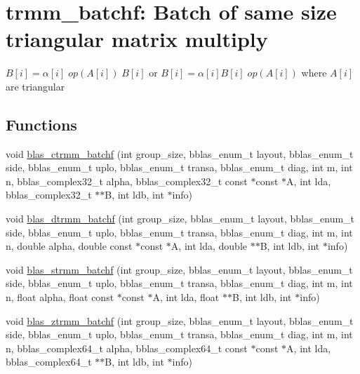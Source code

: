 \hypertarget{group__trmm__batchf}{}\section{trmm\+\_\+batchf\+: Batch of same size triangular matrix multiply}
\label{group__trmm__batchf}


$ B[i] = \alpha[i] \;op(A[i])\; B[i] $ or $ B[i] = \alpha[i] B[i] \;op(A[i]) $ where $ A[i] $ are triangular  


\subsection*{Functions}
\begin{DoxyCompactItemize}
\item 
void \hyperlink{group__trmm__batchf_ga64f7bbfcf4afda9c0cb5ed92dfe875ea}{blas\+\_\+ctrmm\+\_\+batchf} (int group\+\_\+size, bblas\+\_\+enum\+\_\+t layout, bblas\+\_\+enum\+\_\+t side, bblas\+\_\+enum\+\_\+t uplo, bblas\+\_\+enum\+\_\+t transa, bblas\+\_\+enum\+\_\+t diag, int m, int n, bblas\+\_\+complex32\+\_\+t alpha, bblas\+\_\+complex32\+\_\+t const $\ast$const $\ast$A, int lda, bblas\+\_\+complex32\+\_\+t $\ast$$\ast$B, int ldb, int $\ast$info)
\item 
void \hyperlink{group__trmm__batchf_ga5ec52f4bdb997bc0f3c8045fbd7a3280}{blas\+\_\+dtrmm\+\_\+batchf} (int group\+\_\+size, bblas\+\_\+enum\+\_\+t layout, bblas\+\_\+enum\+\_\+t side, bblas\+\_\+enum\+\_\+t uplo, bblas\+\_\+enum\+\_\+t transa, bblas\+\_\+enum\+\_\+t diag, int m, int n, double alpha, double const $\ast$const $\ast$A, int lda, double $\ast$$\ast$B, int ldb, int $\ast$info)
\item 
void \hyperlink{group__trmm__batchf_ga5c431462721e9faae6711830d473c713}{blas\+\_\+strmm\+\_\+batchf} (int group\+\_\+size, bblas\+\_\+enum\+\_\+t layout, bblas\+\_\+enum\+\_\+t side, bblas\+\_\+enum\+\_\+t uplo, bblas\+\_\+enum\+\_\+t transa, bblas\+\_\+enum\+\_\+t diag, int m, int n, float alpha, float const $\ast$const $\ast$A, int lda, float $\ast$$\ast$B, int ldb, int $\ast$info)
\item 
void \hyperlink{group__trmm__batchf_ga8649c49d5fcfc65a5cf0432fdf29660b}{blas\+\_\+ztrmm\+\_\+batchf} (int group\+\_\+size, bblas\+\_\+enum\+\_\+t layout, bblas\+\_\+enum\+\_\+t side, bblas\+\_\+enum\+\_\+t uplo, bblas\+\_\+enum\+\_\+t transa, bblas\+\_\+enum\+\_\+t diag, int m, int n, bblas\+\_\+complex64\+\_\+t alpha, bblas\+\_\+complex64\+\_\+t const $\ast$const $\ast$A, int lda, bblas\+\_\+complex64\+\_\+t $\ast$$\ast$B, int ldb, int $\ast$info)
\end{DoxyCompactItemize}


